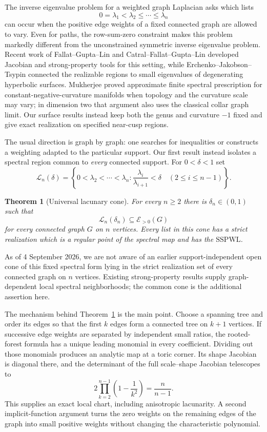 \documentclass[11pt,reqno]{amsart}
\newtheorem{theorem}{Theorem}[section]
\theoremstyle{definition}
\theoremstyle{remark}
\newcommand{\cL}{\mathcal L}
\newcommand{\SSPWL}{\ensuremath{\mathrm{SSPWL}}}
\newcommand{\Epos}{\mathcal E_{>0}}
\begin{document}
The inverse eigenvalue problem for a weighted graph Laplacian asks which
lists
\[
  0=\lambda_1<\lambda_2\le\cdots\le\lambda_n
\]
can occur when the positive edge weights of a fixed connected graph are
allowed to vary.  Even for paths, the row-sum-zero constraint makes this
problem markedly different from the unconstrained symmetric inverse
eigenvalue problem.  Recent work of Fallat--Gupta--Lin
\cite{FGL2025} and Catral--Fallat--Gupta--Lin \cite{CFGL2026} developed
Jacobian and strong-property tools for this setting, while
Erchenko--Jakobson--Tsypin \cite{EJT2026} connected the realizable regions to
small eigenvalues of degenerating hyperbolic surfaces.
Mukherjee \cite{Mukherjee2026} proved approximate finite spectral
prescription for constant-negative-curvature manifolds when topology and the
curvature scale may vary; in dimension two that argument also uses the
classical collar graph limit.  Our surface results instead keep both the genus
and curvature $-1$ fixed and give exact realization on specified near-cusp
regions.

The usual direction is graph by graph: one searches for inequalities or
constructs a weighting adapted to the particular support.  Our first result
instead isolates a spectral region common to \emph{every} connected support.
For $0<\delta<1$ set
\begin{equation}\label{eq:lacunary-cone-intro}
 \cL_n(\delta)=
 \left\{0<\lambda_2<\cdots<\lambda_n:
  \frac{\lambda_i}{\lambda_{i+1}}<\delta
  \quad(2\le i\le n-1)\right\}.
\end{equation}

\begin{theorem}[Universal lacunary cone]\label{thm:intro-universal}
For every $n\ge2$ there is $\delta_n\in(0,1)$ such that
\[
  \cL_n(\delta_n)\subseteq\Epos(G)
\]
for every connected graph $G$ on $n$ vertices.  Every list in this cone has
a strict realization which is a regular point of the spectral map and has
the \SSPWL.
\end{theorem}

As of 4 September 2026, we are not aware of an earlier
support-independent open cone of this fixed spectral form lying in the strict
realization set of every connected graph on $n$ vertices.  Existing
strong-property results supply graph-dependent local spectral neighborhoods;
the common cone is the additional assertion here.

The mechanism behind Theorem~\ref{thm:intro-universal} is the main point.
Choose a spanning tree and order its edges so that the first $k$ edges form
a connected tree on $k+1$ vertices.  If successive edge weights are separated by independent small
ratios, the rooted-forest formula has a unique leading monomial in every
coefficient.  Dividing out those monomials produces an analytic map at a
toric corner.  Its shape Jacobian is diagonal there, and the determinant of
the full scale--shape Jacobian telescopes to
\[
  2\prod_{k=2}^{n-1}\left(1-\frac1{k^2}\right)=\frac{n}{n-1}.
\]
This supplies an exact local chart, including anisotropic lacunarity.  A
second implicit-function argument turns the zero weights on the remaining
edges of the graph into small positive weights without changing the
characteristic polynomial.
\end{document}
